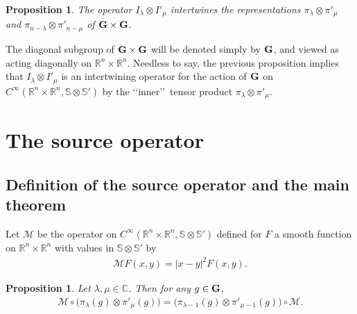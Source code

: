 \documentclass[10pt,a4paper]{amsart}
\numberwithin{equation}{section}
\newtheorem{prop}[theor]{Proposition}
\begin{document}
\begin{prop}
The operator $I_\lambda \otimes I'_\mu$ intertwines the representations $\pi_\lambda \otimes \pi'_\mu$ and $\pi_{n-\lambda} \otimes \pi'_{n-\mu}$ of $\bf G\times \bf G$.
\end{prop}
The diagonal subgroup of $\bf G \times \bf G$ will be denoted simply by $\bf G$, and viewed as acting diagonally on $\mathbb R^n\times \mathbb R^n$. Needless to say, the previous proposition implies that $I_\lambda \otimes I'_\mu$ is an intertwining operator for the action of $\bf G$ on $C^\infty(\mathbb R^n\times \mathbb R^n, \mathbb S\otimes\mathbb S')$ by the \lq\lq inner\rq\rq\ tensor product $\pi_\lambda\otimes \pi'_\mu$.

\section{The source operator}

\subsection{Definition of the source operator and the main theorem}

Let $\mathcal M$ be the operator on $C^\infty(\mathbb R^n\times \mathbb R^n, \mathbb S\otimes\mathbb S')$ defined for $F$ a smooth function on $\mathbb R^n\times \mathbb R^n$ with values in $\mathbb S\otimes \mathbb S'$ by
\begin{gather*}
\mathcal{M} F(x,y) = \vert x-y\vert^2 F(x,y) .
\end{gather*}

\begin{prop} \label{covM}
 Let $\lambda, \mu\in \mathbb C$. Then for any $g\in \bf G$,
 \begin{gather*}
 \mathcal{M} \circ\big(\pi_\lambda(g) \otimes \pi'_\mu(g)\big) = \big(\pi_{\lambda-1}(g)\otimes \pi'_{\mu-1}(g)\big)\circ \mathcal{M} .
 \end{gather*}
\end{prop}
\end{document}
